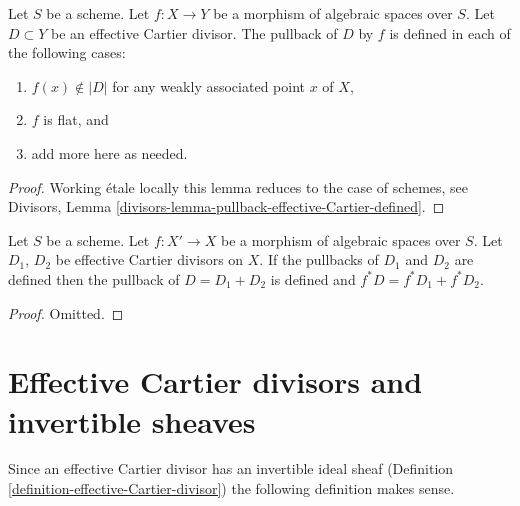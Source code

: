 \begin{lemma}
\label{lemma-pullback-effective-Cartier-defined}
Let $S$ be a scheme.
Let $f : X \to Y$ be a morphism of algebraic spaces over $S$.
Let $D \subset Y$ be an effective Cartier divisor.
The pullback of $D$ by $f$ is defined in each of the following cases:
\begin{enumerate}
\item $f(x) \not \in |D|$ for any weakly associated point $x$ of $X$,
\item $f$ is flat, and
\item add more here as needed.
\end{enumerate}
\end{lemma}

\begin{proof}
Working \'etale locally this lemma reduces to the case of schemes, see
Divisors, Lemma \ref{divisors-lemma-pullback-effective-Cartier-defined}.
\end{proof}

\begin{lemma}
\label{lemma-pullback-effective-Cartier-divisors-additive}
Let $S$ be a scheme.
Let $f : X' \to X$ be a morphism of algebraic spaces over $S$.
Let $D_1$, $D_2$ be effective Cartier divisors on $X$.
If the pullbacks of $D_1$ and $D_2$ are defined then the
pullback of $D = D_1 + D_2$ is defined and
$f^*D = f^*D_1 + f^*D_2$.
\end{lemma}

\begin{proof}
Omitted.
\end{proof}




\section{Effective Cartier divisors and invertible sheaves}
\label{section-effective-Cartier-invertible}

\noindent
Since an effective Cartier divisor has an invertible ideal sheaf
(Definition \ref{definition-effective-Cartier-divisor}) the
following definition makes sense.

